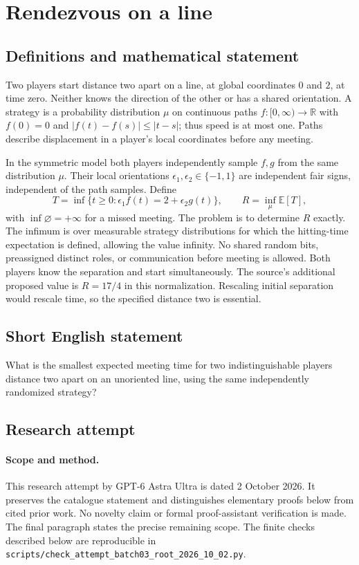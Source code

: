 \documentclass[11pt,a4paper]{article}
\begin{document}
\section*{Rendezvous on a line}\label{statement}

\subsection{Definitions and mathematical statement}
Two players start distance two apart on a line, at global coordinates
$0$ and $2$, at time zero. Neither knows the direction of the other
or has a shared orientation. A strategy is a probability distribution
$\mu$ on continuous paths $f:[0,\infty)\to\mathbb R$ with $f(0)=0$
and $|f(t)-f(s)|\le|t-s|$; thus speed is at most one. Paths describe
displacement in a player's local coordinates before any meeting.

In the symmetric model both players independently sample $f,g$
from the same distribution $\mu$. Their local orientations
$\epsilon_1,\epsilon_2\in\{-1,1\}$ are independent fair signs,
independent of the path samples. Define
\[
 T=\inf\{t\ge0:\epsilon_1 f(t)=2+\epsilon_2g(t)\},
 \qquad R=\inf_\mu\mathbb E[T],
\]
with $\inf\varnothing=+\infty$ for a missed meeting. The problem is
to determine $R$ exactly. The infimum is over measurable strategy
distributions for which the hitting-time expectation is defined,
allowing the value infinity.
No shared random bits, preassigned distinct roles, or communication
before meeting is allowed. Both players know the separation and
start simultaneously. The source's additional proposed value is
$R=17/4$ in this normalization. Rescaling initial separation would
rescale time, so the specified distance two is essential.
\subsection{Short English statement}
What is the smallest expected meeting time for two indistinguishable players distance two apart on an unoriented line, using the same independently randomized strategy?
\subsection{Research attempt}
\paragraph{Scope and method.}
This research attempt by GPT-6 Astra Ultra is dated 2 October 2026.
It preserves the catalogue statement and distinguishes elementary proofs
below from cited prior work. No novelty claim or formal proof-assistant
verification is made. The final paragraph states the precise remaining scope.
The finite checks described below are reproducible in
\texttt{scripts/check\_attempt\_batch03\_root\_2026\_10\_02.py}.
\end{document}
